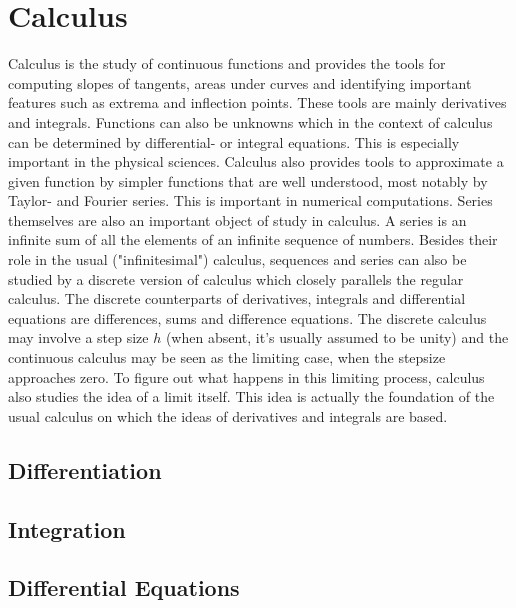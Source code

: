 \documentclass[12pt]{article}
\begin{document}
\section{Calculus}
Calculus is the study of continuous functions and provides the tools for computing slopes of tangents, areas under curves and identifying important features such as extrema and inflection points. These tools are mainly derivatives and integrals. Functions can also be unknowns which in the context of calculus can be determined by differential- or integral equations. This is especially important in the physical sciences. Calculus also provides tools to approximate a given function by simpler functions that are well understood, most notably by Taylor- and Fourier series. This is important in numerical computations. Series themselves are also an important object of study in calculus. A series is an infinite sum of all the elements of an infinite sequence of numbers. Besides their role in the usual ("infinitesimal") calculus, sequences and series can also be studied by a discrete version of calculus which closely parallels the regular calculus. The discrete counterparts of derivatives, integrals and differential equations are differences, sums and difference equations. The discrete calculus may involve a step size $h$ (when absent, it's usually assumed to be unity) and the continuous calculus may be seen as the limiting case, when the stepsize approaches zero. To figure out what happens in this limiting process, calculus also studies the idea of a limit itself. This idea is actually the foundation of the usual calculus on which the ideas of derivatives and integrals are based.
\subsection{Differentiation}
\subsection{Integration} 
  
\subsection{Differential Equations}
\end{document}
